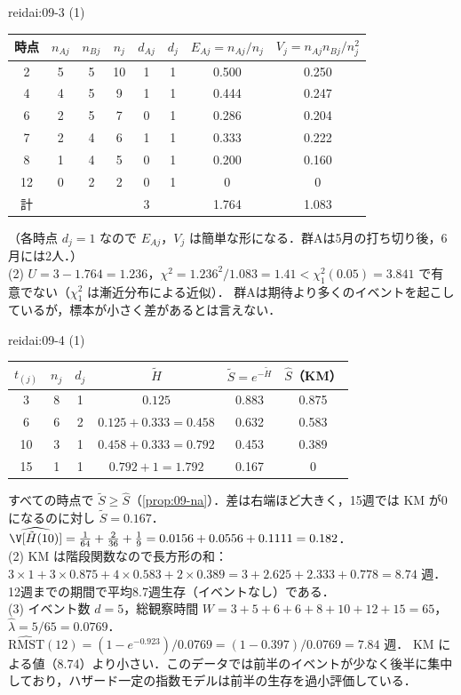 \begin{kaitou}{reidai:09-3}
(1)
\begin{center}\small
\begin{tabular}{@{}cccccccc@{}}
\toprule
時点 & $n_{Aj}$ & $n_{Bj}$ & $n_j$ & $d_{Aj}$ & $d_j$ & $E_{Aj}=n_{Aj}/n_j$ & $V_j=n_{Aj}n_{Bj}/n_j^2$\\
\midrule
2 & 5 & 5 & 10 & 1 & 1 & 0.500 & 0.250\\
4 & 4 & 5 & 9 & 1 & 1 & 0.444 & 0.247\\
6 & 2 & 5 & 7 & 0 & 1 & 0.286 & 0.204\\
7 & 2 & 4 & 6 & 1 & 1 & 0.333 & 0.222\\
8 & 1 & 4 & 5 & 0 & 1 & 0.200 & 0.160\\
12 & 0 & 2 & 2 & 0 & 1 & 0 & 0\\
\midrule
計 & & & & 3 & & 1.764 & 1.083\\
\bottomrule
\end{tabular}
\end{center}
（各時点 $d_j=1$ なので $E_{Aj}$，$V_j$ は簡単な形になる．群Aは5月の打ち切り後，6月には2人．）\\
(2) $U=3-1.764=1.236$，$\chi^2=1.236^2/1.083=1.41<\chi^2_1(0.05)=3.841$ で有意でない（$\chi^2_1$ は漸近分布による近似）．
群Aは期待より多くのイベントを起こしているが，標本が小さく差があるとは言えない．
\end{kaitou}

\begin{kaitou}{reidai:09-4}
(1)
\begin{center}\small
\begin{tabular}{@{}cccccc@{}}
\toprule
$t_{(j)}$ & $n_j$ & $d_j$ & $\tilde H$ & $\tilde S=e^{-\tilde H}$ & $\hat S$（KM）\\
\midrule
3 & 8 & 1 & $0.125$ & 0.883 & 0.875\\
6 & 6 & 2 & $0.125+0.333=0.458$ & 0.632 & 0.583\\
10 & 3 & 1 & $0.458+0.333=0.792$ & 0.453 & 0.389\\
15 & 1 & 1 & $0.792+1=1.792$ & 0.167 & 0\\
\bottomrule
\end{tabular}
\end{center}
すべての時点で $\tilde S\ge\hat S$（\cref{prop:09-na}）．差は右端ほど大きく，15週では KM が0になるのに対し $\tilde S=0.167$．
$\widehat\V[\tilde H(10)]=\frac1{64}+\frac2{36}+\frac19=0.0156+0.0556+0.1111=0.182$．\\
(2) KM は階段関数なので長方形の和：$3\times1+3\times0.875+4\times0.583+2\times0.389=3+2.625+2.333+0.778=8.74$ 週．
12週までの期間で平均8.7週生存（イベントなし）である．\\
(3) イベント数 $d=5$，総観察時間 $W=3+5+6+6+8+10+12+15=65$，$\hat\lambda=5/65=0.0769$．
$\widehat{\mathrm{RMST}}(12)=(1-e^{-0.923})/0.0769=(1-0.397)/0.0769=7.84$ 週．
KM による値（8.74）より小さい．このデータでは前半のイベントが少なく後半に集中しており，ハザード一定の指数モデルは前半の生存を過小評価している．
\end{kaitou}

